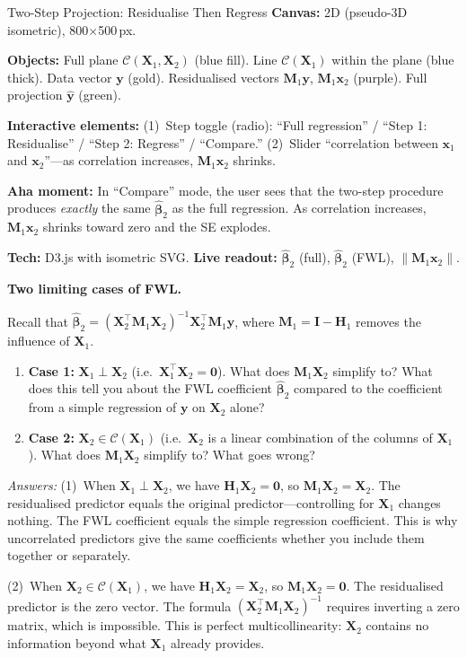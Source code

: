 \documentclass[11pt,a4paper]{article}
\theoremstyle{plain}
\theoremstyle{definition}
\newcommand{\yhat}{\hat{\bm{y}}}
\newcommand{\bhat}{\hat{\bm{\beta}}}
\newcommand{\bX}{\bm{X}}
\newcommand{\by}{\bm{y}}
\newcommand{\bH}{\bm{H}}
\newcommand{\bM}{\bm{M}}
\newcommand{\bI}{\bm{I}}
\newcommand{\Col}{\mathcal{C}}
\newcommand{\norm}[1]{\left\lVert #1 \right\rVert}
\begin{document}
\begin{vizspec}{Two-Step Projection: Residualise Then Regress}
\textbf{Canvas:} 2D (pseudo-3D isometric), 800$\times$500\,px.

\textbf{Objects:} Full plane $\Col(\bX_1, \bX_2)$
(\textcolor{colspace}{blue} fill).  Line $\Col(\bX_1)$ within the plane
(\textcolor{colspace}{blue} thick).  Data vector $\by$
(\textcolor{response}{gold}).  Residualised vectors $\bM_1\by$,
$\bM_1\bm{x}_2$ (\textcolor{constraint}{purple}).  Full projection
$\yhat$ (\textcolor{projection}{green}).

\textbf{Interactive elements:}
(1)~Step toggle (radio): ``Full regression'' / ``Step 1: Residualise'' /
``Step 2: Regress'' / ``Compare.''
(2)~Slider ``correlation between $\bm{x}_1$ and $\bm{x}_2$''---as
correlation increases, $\bM_1\bm{x}_2$ shrinks.

\textbf{Aha moment:} In ``Compare'' mode, the user sees that the
two-step procedure produces \emph{exactly} the same $\bhat_2$ as the
full regression.  As correlation increases, $\bM_1\bm{x}_2$ shrinks
toward zero and the SE explodes.

\textbf{Tech:} D3.js with isometric SVG.
\quad \textbf{Live readout:} $\bhat_2$ (full), $\bhat_2$ (FWL),
$\norm{\bM_1\bm{x}_2}$.
\end{vizspec}

\begin{stopandthink}
\textbf{Two limiting cases of FWL.}

Recall that $\bhat_2 = (\bX_2^\top \bM_1 \bX_2)^{-1}\bX_2^\top \bM_1 \by$,
where $\bM_1 = \bI - \bH_1$ removes the influence of $\bX_1$.
\begin{enumerate}[nosep]
  \item \textbf{Case 1:} $\bX_1 \perp \bX_2$
    (i.e.\ $\bX_1^\top \bX_2 = \bm{0}$).
    What does $\bM_1 \bX_2$ simplify to?
    What does this tell you about the FWL coefficient $\bhat_2$
    compared to the coefficient from a simple regression of $\by$ on $\bX_2$ alone?
  \item \textbf{Case 2:} $\bX_2 \in \Col(\bX_1)$
    (i.e.\ $\bX_2$ is a linear combination of the columns of $\bX_1$).
    What does $\bM_1 \bX_2$ simplify to?
    What goes wrong?
\end{enumerate}
\emph{Answers:}
(1)~When $\bX_1 \perp \bX_2$, we have $\bH_1 \bX_2 = \bm{0}$, so
$\bM_1 \bX_2 = \bX_2$. The residualised predictor equals the original
predictor---controlling for $\bX_1$ changes nothing.
The FWL coefficient equals the simple regression coefficient.
This is why uncorrelated predictors give the same coefficients whether
you include them together or separately.

(2)~When $\bX_2 \in \Col(\bX_1)$, we have $\bH_1 \bX_2 = \bX_2$, so
$\bM_1 \bX_2 = \bm{0}$. The residualised predictor is the zero vector.
The formula $(\bX_2^\top \bM_1 \bX_2)^{-1}$ requires inverting a zero matrix,
which is impossible.
This is perfect multicollinearity: $\bX_2$ contains no information
beyond what $\bX_1$ already provides.
\end{stopandthink}
\end{document}
